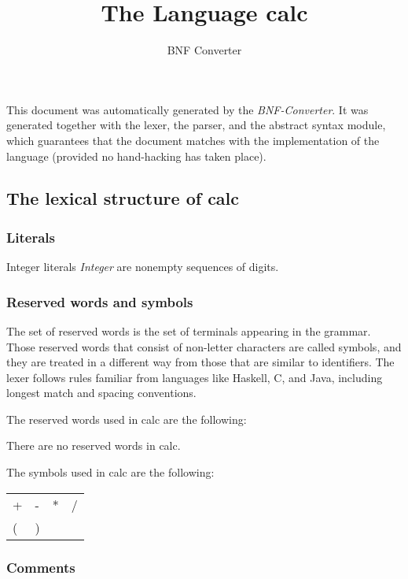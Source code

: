 \documentclass{article}
\title{The Language calc}
\author{BNF Converter}
\begin{document}
\maketitle
\clearpage

\tableofcontents
\clearpage

This document was automatically generated by the \textit{BNF-Converter}. It was generated together with the lexer, the parser, and the abstract syntax module, which guarantees that the document matches with the implementation of the language (provided no hand-hacking has taken place).

\hypertarget{toc1}{}
\subsection*{The lexical structure of calc}

\hypertarget{toc2}{}
\subsubsection*{Literals}

Integer literals \textit{Integer} are nonempty sequences of digits.

\hypertarget{toc3}{}
\subsubsection*{Reserved words and symbols}

The set of reserved words is the set of terminals appearing in the grammar. Those reserved words that consist of non-letter characters are called symbols, and they are treated in a different way from those that are similar to identifiers. The lexer follows rules familiar from languages like Haskell, C, and Java, including longest match and spacing conventions.

The reserved words used in calc are the following:

There are no reserved words in calc.

The symbols used in calc are the following:

\begin{center}\begin{tabular}{llll}
+ & - & * & / \\
( & ) &  \\
\end{tabular}\end{center}

\hypertarget{toc4}{}
\subsubsection*{Comments}
\end{document}

